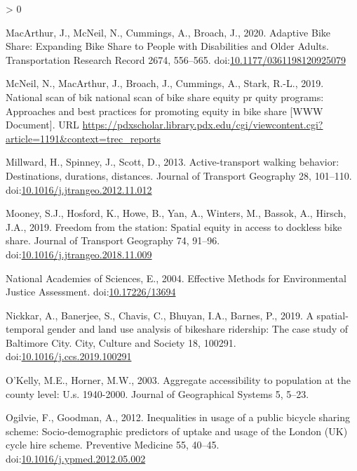 \documentclass[]{elsarticle} %
\newlength{\cslhangindent}
\newenvironment{CSLReferences}[2] %
 {%
  \setlength{\parindent}{0pt}
  \ifodd #1 \everypar{\setlength{\hangindent}{\cslhangindent}}\ignorespaces\fi
  \ifnum #2 > 0
  \setlength{\parskip}{#2\baselineskip}
  \fi
 }%
 {}
\begin{document}
\begin{CSLReferences}{1}{0}
\leavevmode\hypertarget{ref-macarthurAdaptiveBikeShare2020}{}%
MacArthur, J., McNeil, N., Cummings, A., Broach, J., 2020. Adaptive
{Bike Share}: {Expanding Bike Share} to {People} with {Disabilities} and
{Older Adults}. Transportation Research Record 2674, 556--565.
doi:\href{https://doi.org/10.1177/0361198120925079}{10.1177/0361198120925079}

\leavevmode\hypertarget{ref-trec2019}{}%
McNeil, N., MacArthur, J., Broach, J., Cummings, A., Stark, R.-L., 2019.
National scan of bik national scan of bike share equity pr quity
programs: Approaches and best practices for promoting equity in bike
share {[}WWW Document{]}. URL
\url{https://pdxscholar.library.pdx.edu/cgi/viewcontent.cgi?article=1191\&context=trec_reports}

\leavevmode\hypertarget{ref-millwardActivetransportWalkingBehavior2013}{}%
Millward, H., Spinney, J., Scott, D., 2013. Active-transport walking
behavior: Destinations, durations, distances. Journal of Transport
Geography 28, 101--110.
doi:\href{https://doi.org/10.1016/j.jtrangeo.2012.11.012}{10.1016/j.jtrangeo.2012.11.012}

\leavevmode\hypertarget{ref-mooneyFreedomStationSpatial2019}{}%
Mooney, S.J., Hosford, K., Howe, B., Yan, A., Winters, M., Bassok, A.,
Hirsch, J.A., 2019. Freedom from the station: {Spatial} equity in access
to dockless bike share. Journal of Transport Geography 74, 91--96.
doi:\href{https://doi.org/10.1016/j.jtrangeo.2018.11.009}{10.1016/j.jtrangeo.2018.11.009}

\leavevmode\hypertarget{ref-nationalacademiesofsciencesEffectiveMethodsEnvironmental2004}{}%
National Academies of Sciences, E., 2004. Effective {Methods} for
{Environmental Justice Assessment}.
doi:\href{https://doi.org/10.17226/13694}{10.17226/13694}

\leavevmode\hypertarget{ref-nickkarSpatialtemporalGenderLand2019}{}%
Nickkar, A., Banerjee, S., Chavis, C., Bhuyan, I.A., Barnes, P., 2019. A
spatial-temporal gender and land use analysis of bikeshare ridership:
{The} case study of {Baltimore City}. City, Culture and Society 18,
100291.
doi:\href{https://doi.org/10.1016/j.ccs.2019.100291}{10.1016/j.ccs.2019.100291}

\leavevmode\hypertarget{ref-okelly2003aggregate}{}%
O'Kelly, M.E., Horner, M.W., 2003. Aggregate accessibility to population
at the county level: U.s. 1940-2000. Journal of Geographical Systems 5,
5--23.

\leavevmode\hypertarget{ref-ogilvieInequalitiesUsagePublic2012}{}%
Ogilvie, F., Goodman, A., 2012. Inequalities in usage of a public
bicycle sharing scheme: {Socio}-demographic predictors of uptake and
usage of the {London} ({UK}) cycle hire scheme. Preventive Medicine 55,
40--45.
doi:\href{https://doi.org/10.1016/j.ypmed.2012.05.002}{10.1016/j.ypmed.2012.05.002}


\end{CSLReferences}
\end{document}
